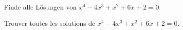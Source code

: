 Finde alle Lösungen von $x^4 - 4x^3 + x^2 + 6x + 2 = 0$.

\bigskip

Trouver toutes les solutions de $x^4 - 4x^3 + x^2 + 6x + 2 = 0$.